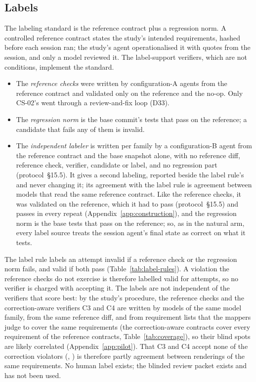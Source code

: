 \subsection{Labels}
\label{sec:design-labels}
The labeling standard is the reference contract plus a regression norm. A controlled reference contract states the study's intended requirements, hashed before each session ran; the study's agent operationalised it with quotes from the session, and only a model reviewed it. The label-support verifiers, which are not conditions, implement the standard.
\begin{itemize}
\item The \emph{reference checks} were written by configuration-A agents from the reference contract and validated only on the reference and the no-op. Only CS-02's went through a review-and-fix loop (D33).
\item The \emph{regression norm} is the base commit's tests that pass on the reference; a candidate that fails any of them is invalid.
\item The \emph{independent labeler} is written per family by a configuration-B agent from the reference contract and the base snapshot alone, with no reference diff, reference check, verifier, candidate or label, and no regression part (protocol~\S15.5). It gives a second labeling, reported beside the label rule's and never changing it; its agreement with the label rule is agreement between models that read the same reference contract. Like the reference checks, it was validated on the reference, which it had to pass (protocol~\S15.5) and passes in every repeat (Appendix~\ref{app:construction}), and the regression norm is the base tests that pass on the reference; so, as in the natural arm, every label source treats the session agent's final state as correct on what it tests.
\end{itemize}
The label rule labels an attempt invalid if a reference check or the regression norm fails, and valid if both pass (Table~\ref{tab:label-rules}). A violation the reference checks do not exercise is therefore labelled valid for attempts, so no verifier is charged with accepting it. The labels are not independent of the verifiers that score best: by the study's procedure, the reference checks and the correction-aware verifiers C3 and C4 are written by models of the same model family, from the same reference diff, and from requirement lists that the mappers judge to cover the same requirements (the correction-aware contracts cover every requirement of the reference contracts, Table~\ref{tab:coverage}), so their blind spots are likely correlated (Appendix~\ref{app:pilot}). That C3 and C4 accept none of the correction violators (, ) is therefore partly agreement between renderings of the same requirements. No human label exists; the blinded review packet exists and has not been used.

